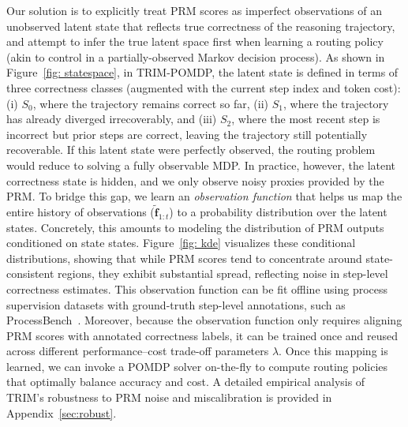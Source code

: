 \documentclass{article}
\theoremstyle{plain}
\theoremstyle{definition}
\theoremstyle{remark}
\begin{document}
Our solution is to explicitly treat PRM scores as imperfect observations of an unobserved latent state that reflects true correctness of the reasoning trajectory, and attempt to infer the true latent space first when learning a routing policy (akin to control in a partially-observed Markov decision process). As shown in Figure~\ref{fig: statespace}, in TRIM-POMDP, the latent state is defined in terms of three correctness classes (augmented with the current step index and token cost): (i) $S_0$, where the trajectory remains correct so far, (ii) $S_1$, where the trajectory has already diverged irrecoverably, and (iii) $S_2$, where the most recent step is incorrect but prior steps are correct, leaving the trajectory still potentially recoverable. If this latent state were perfectly observed, the routing problem would reduce to solving a fully observable MDP. In practice, however, the latent correctness state is hidden, and we only observe noisy proxies provided by the PRM. To bridge this gap, we learn an \emph{observation function} that helps us map the entire history of observations ($\tilde{\mathbf{f}}_{1:t}$) to a probability distribution over the latent states. 
Concretely, this amounts to modeling the distribution of PRM outputs conditioned on state states. Figure~\ref{fig: kde} visualizes these conditional distributions, showing that while PRM scores tend to concentrate around state-consistent regions, they exhibit substantial spread, reflecting noise in step-level correctness estimates. This observation function can be fit offline using process supervision datasets with ground-truth step-level annotations, such as ProcessBench~\citep{processbench}.
Moreover, because the observation function only requires aligning PRM scores with annotated correctness labels, it can be trained once and reused across different performance–cost trade-off parameters $\lambda$. Once this mapping is learned, we can invoke a POMDP solver on-the-fly to compute routing policies that optimally balance accuracy and cost. A detailed empirical analysis of TRIM’s robustness to PRM noise and miscalibration is provided in Appendix~\ref{sec:robust}.
\end{document}
